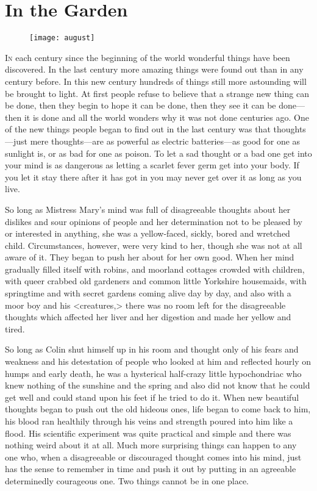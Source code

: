 \chapter{In the Garden} 
	
\begin{figure}[t!]
\centering
\texttt{[image: august]}
\end{figure}

 \lettrine[]{I}{n} each century since the beginning of the world wonderful things have been discovered. In the last century more amazing things were found out than in any century before. In this new century hundreds of things still more astounding will be brought to light. At first people refuse to believe that a strange new thing can be done, then they begin to hope it can be done, then they see it can be done—then it is done and all the world wonders why it was not done centuries ago. One of the new things people began to find out in the last century was that thoughts—just mere thoughts—are as powerful as electric batteries—as good for one as sunlight is, or as bad for one as poison. To let a sad thought or a bad one get into your mind is as dangerous as letting a scarlet fever germ get into your body. If you let it stay there after it has got in you may never get over it as long as you live.

So long as Mistress Mary's mind was full of disagreeable thoughts about her dislikes and sour opinions of people and her determination not to be pleased by or interested in anything, she was a yellow-faced, sickly, bored and wretched child. Circumstances, however, were very kind to her, though she was not at all aware of it. They began to push her about for her own good. When her mind gradually filled itself with robins, and moorland cottages crowded with children, with queer crabbed old gardeners and common little Yorkshire housemaids, with springtime and with secret gardens coming alive day by day, and also with a moor boy and his <creatures,> there was no room left for the disagreeable thoughts which affected her liver and her digestion and made her yellow and tired.

So long as Colin shut himself up in his room and thought only of his fears and weakness and his detestation of people who looked at him and reflected hourly on humps and early death, he was a hysterical half-crazy little hypochondriac who knew nothing of the sunshine and the spring and also did not know that he could get well and could stand upon his feet if he tried to do it. When new beautiful thoughts began to push out the old hideous ones, life began to come back to him, his blood ran healthily through his veins and strength poured into him like a flood. His scientific experiment was quite practical and simple and there was nothing weird about it at all. Much more surprising things can happen to any one who, when a disagreeable or discouraged thought comes into his mind, just has the sense to remember in time and push it out by putting in an agreeable determinedly courageous one. Two things cannot be in one place.

